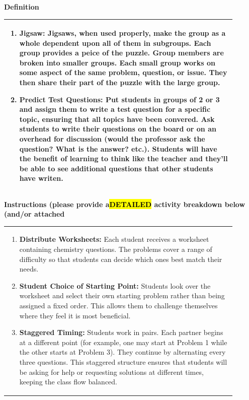 \documentclass{article}
\begin{document}
{{\large\textbf{Definition}}\\
\noindent
\begin{tabular}{|p{0.9\linewidth}|}
\hline
\begin{enumerate}
    \item\textbf{Jigsaw:} Jigsaws, when used properly, make the group as a whole dependent upon all of them in subgroups. Each group provides a peice of the puzzle. Group members are broken into smaller groups. Each small group works on some aspect of the same problem, question, or issue. They then share their part of the puzzle with the large group.
    \item\textbf{Predict Test Questions:}  Put students in groups of 2 or 3 and assign them to write a test question for a specific topic, ensuring that all topics have been convered. Ask students to write their questions on the board or on an overhead for discussion (would the professor ask the question? What is the answer? etc.). Students will have the benefit of learning to think like the teacher and they'll be able to see additional questions that other students have writen.
 
\end{enumerate}\\
\hline
\end{tabular}
\vspace{0.2cm}
\newpage
{\large\textbf{Instructions (please provide a\hl{DETAILED} activity breakdown below (and/or attached}}\\
\noindent
\begin{tabular}{|p{0.9\linewidth}|}
\hline
\vspace{0.2cm}
\begin{enumerate}
    \item \textbf{Distribute Worksheets:} Each student receives a worksheet containing chemistry questions. The problems cover a range of difficulty so that students can decide which ones best match their needs.
    
    \item \textbf{Student Choice of Starting Point:} Students look over the worksheet and select their own starting problem rather than being assigned a fixed order. This allows them to challenge themselves where they feel it is most beneficial.
    
    \item \textbf{Staggered Timing:} Students work in pairs. Each partner begins at a different point (for example, one may start at Problem 1 while the other starts at Problem 3). They continue by alternating every three questions. This staggered structure ensures that students will be asking for help or requesting solutions at different times, keeping the class flow balanced.
    

\end{enumerate}
\end{tabular}}
\end{document}
